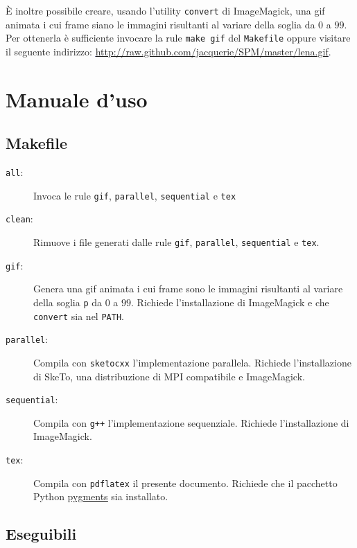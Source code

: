 \documentclass[12pt]{article}
\begin{document}
    È inoltre possibile creare, usando l'utility \texttt{convert} di
    ImageMagick, una gif animata i cui frame siano le immagini risultanti
    al variare della soglia da \(0\) a \(99\). Per ottenerla \`e sufficiente
    invocare la rule \texttt{make gif} del \texttt{Makefile} oppure visitare il
    seguente indirizzo: \textcolor{blue}{\underline{\url{http://raw.github.com/jacquerie/SPM/master/lena.gif}}}.

  \appendix
    \section{Manuale d'uso}
      \subsection{Makefile}

      \begin{description}
        \item[\texttt{all}:] Invoca le rule \texttt{gif}, \texttt{parallel}, \texttt{sequential} e \texttt{tex}
        \item[\texttt{clean}:] Rimuove i file generati dalle rule \texttt{gif}, \texttt{parallel}, \texttt{sequential} e \texttt{tex}.
        \item[\texttt{gif}:] Genera una gif animata i cui frame sono le
          immagini risultanti al variare della soglia \texttt{p} da \(0\) a
          \(99\). Richiede l'installazione di ImageMagick e che \texttt{convert}
          sia nel \texttt{PATH}.
        \item[\texttt{parallel}:] Compila con \texttt{sketocxx}
          l'implementazione parallela. Richiede l'installazione di SkeTo, una
          distribuzione di MPI compatibile e ImageMagick.
        \item[\texttt{sequential}:] Compila con \texttt{g++} l'implementazione
          sequenziale. Richiede l'installazione di ImageMagick.
        \item[\texttt{tex}:] Compila con \texttt{pdflatex} il presente documento. Richiede che il pacchetto Python \href{http://pygments.org}{\underline{pygments}} sia installato.
      \end{description}

      \subsection{Eseguibili}
\end{document}
